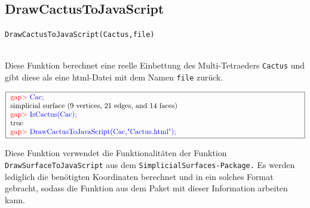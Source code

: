 \documentclass[12pt,titlepage,twoside,cleardoublepage]{article}
\theoremstyle{nummermitklammern}
\numberwithin{equation}{section}
\begin{document}
\subsection{DrawCactusToJavaScript}
\begin{large}
\texttt{DrawCactusToJavaScript(Cactus,file)}
\end{large}\\
Diese Funktion berechnet eine reelle Einbettung des Multi-Tetraeders \texttt{Cactus} und gibt diese als eine html-Datei mit dem Namen \texttt{file} zurück.
\begin{center}
$\fbox{
\parbox{14cm}{
\textcolor{red}{gap$>$} \textcolor{blue}{Cac;}\newline
simplicial surface (9 vertices, 21 edges, and 14 faces)\newline
\textcolor{red}{gap$>$} \textcolor{blue}{IsCactus(Cac);}\newline
true\newline 
\textcolor{red}{gap$>$} \textcolor{blue}{DrawCactusToJavaScript(Cac,"Cactus.html");}
}
}$
\end{center}
Diese Funktion verwendet die Funktionalitäten der Funktion \texttt{DrawSurfaceToJavaScript} aus dem \texttt{SimplicialSurfaces-Package.} Es werden lediglich die benötigten Koordinaten berechnet und in ein solches Format gebracht, sodass die Funktion aus dem Paket mit dieser Information arbeiten kann. 
\end{document}
